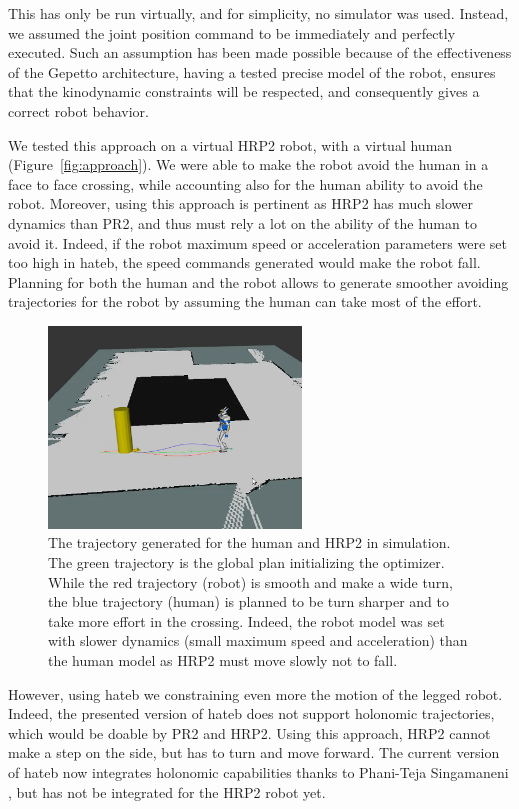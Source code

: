 \documentclass[a4paper,11pt,twoside]{StyleThese}
\begin{document}
This has only be run virtually, and for simplicity, no simulator was used. Instead, we assumed the joint position command to be immediately and perfectly executed. Such an assumption has been made possible because of the effectiveness of the Gepetto architecture, having a tested precise model of the robot, ensures that the kinodynamic constraints will be respected, and consequently gives a correct robot behavior.

We tested this approach on a virtual HRP2 robot, with a virtual human (Figure~\ref{fig:approach}). We were able to make the robot avoid the human in a face to face crossing, while accounting also for the human ability to avoid the robot. Moreover, using this approach is pertinent as HRP2 has much slower dynamics than PR2, and thus must rely a lot on the ability of the human to avoid it. Indeed, if the robot maximum speed or acceleration parameters were set too high in \acrshort{hateb}, the speed commands generated would make the robot fall. Planning for both the human and the robot allows to generate smoother avoiding trajectories for the robot by assuming the human can take most of the effort. 

\begin{figure}[hbtp]
\centering
\includegraphics[width=0.6\textwidth]{figures/chapter2/Chap2HRP2.png}
\caption{The trajectory generated for the human and HRP2 in simulation. The green trajectory is the global plan initializing the optimizer. While the red trajectory (robot) is smooth and make a wide turn, the blue trajectory (human) is planned to be turn sharper and to take more effort in the crossing. Indeed, the robot model was set with slower dynamics (small maximum speed and acceleration) than the human model as HRP2 must move slowly not to fall.}
\label{fig:hrp2}
\end{figure}

However, using \acrshort{hateb} we constraining even more the motion of the legged robot. Indeed, the presented version of \acrshort{hateb} does not support holonomic trajectories, which would be doable by PR2 and HRP2. Using this approach, HRP2 cannot make a step on the side, but has to turn and move forward. The current version of \acrshort{hateb} now integrates holonomic capabilities thanks to Phani-Teja Singamaneni \cite{singamaneni2020hateb}, but has not be integrated for the HRP2 robot yet.	
\end{document}
